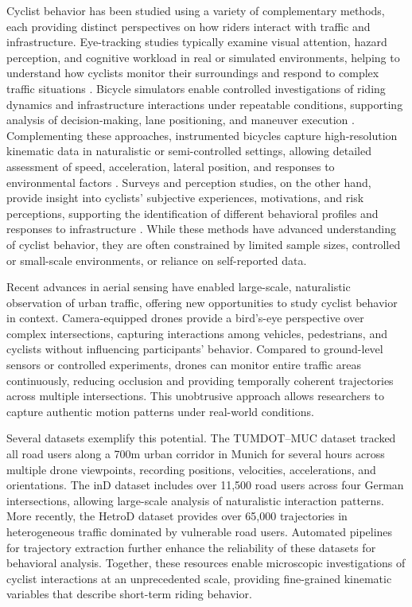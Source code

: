 Cyclist behavior has been studied using a variety of complementary methods, each providing distinct perspectives on how riders interact with traffic and infrastructure. Eye-tracking studies typically examine visual attention, hazard perception, and cognitive workload in real or simulated environments, helping to understand how cyclists monitor their surroundings and respond to complex traffic situations \cite{kchour_understanding_2024, rupi_visual_2019, ma_eye_2024}. 
Bicycle simulators enable controlled investigations of riding dynamics and infrastructure interactions under repeatable conditions, supporting analysis of decision-making, lane positioning, and maneuver execution \cite{meuleners_improving_2023, sasaki_risks_2024, hammami_how_2025}. 
Complementing these approaches, instrumented bicycles capture high-resolution kinematic data in naturalistic or semi-controlled settings, allowing detailed assessment of speed, acceleration, lateral position, and responses to environmental factors \cite{belikhov_exploring_2025, mathuseck_bikesense_2024, saad_riderid_2025}. 
Surveys and perception studies, on the other hand, provide insight into cyclists’ subjective experiences, motivations, and risk perceptions, supporting the identification of different behavioral profiles and responses to infrastructure \cite{berghoefer_cyclists_2022, francke_are_2019,gossling_subjectively_2022, von_stulpnagel_how_2022}. 
While these methods have advanced understanding of cyclist behavior, they are often constrained by limited sample sizes, controlled or small-scale environments, or reliance on self-reported data.


Recent advances in aerial sensing have enabled large-scale, naturalistic observation of urban traffic, offering new opportunities to study cyclist behavior in context. Camera-equipped drones provide a bird’s-eye perspective over complex intersections, capturing interactions among vehicles, pedestrians, and cyclists without influencing participants’ behavior. Compared to ground-level sensors or controlled experiments, drones can monitor entire traffic areas continuously, reducing occlusion and providing temporally coherent trajectories across multiple intersections. This unobtrusive approach allows researchers to capture authentic motion patterns under real-world conditions.


Several datasets exemplify this potential. The TUMDOT–MUC dataset \cite{kutsch_tumdotmuc_2024} tracked all road users along a 700m urban corridor in Munich for several hours across multiple drone viewpoints, recording positions, velocities, accelerations, and orientations. The inD dataset \cite{bock_ind_2020} includes over 11,500 road users across four German intersections, allowing large-scale analysis of naturalistic interaction patterns. More recently, the HetroD dataset \cite{chen_hetrod_2026} provides over 65,000 trajectories in heterogeneous traffic dominated by vulnerable road users. Automated pipelines for trajectory extraction \cite{wang_method_2023} further enhance the reliability of these datasets for behavioral analysis. Together, these resources enable microscopic investigations of cyclist interactions at an unprecedented scale, providing fine-grained kinematic variables that describe short-term riding behavior.

